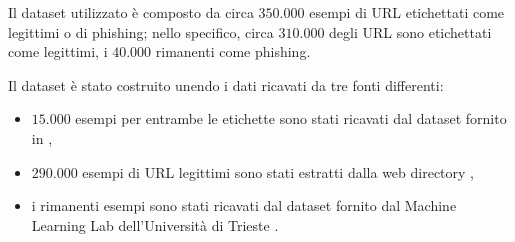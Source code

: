 \documentclass[../../main.tex]{subfiles}
\begin{document}
    Il dataset utilizzato è composto da circa $350.000$ esempi di URL etichettati come legittimi o di phishing; nello specifico, circa $310.000$ degli URL sono etichettati come legittimi, i $40.000$ rimanenti come phishing.

    Il dataset è stato costruito unendo i dati ricavati da tre fonti differenti: 
    \begin{itemize}
        \item $15.000$ esempi per entrambe le etichette sono stati ricavati dal dataset fornito in \cite{article},
        \item $290.000$ esempi di URL legittimi sono stati estratti dalla web directory \cite{botw},
        \item i rimanenti esempi sono stati ricavati dal dataset fornito dal Machine Learning Lab dell'Università di Trieste \cite{machinelearninglab}.
    \end{itemize}
\end{document}
